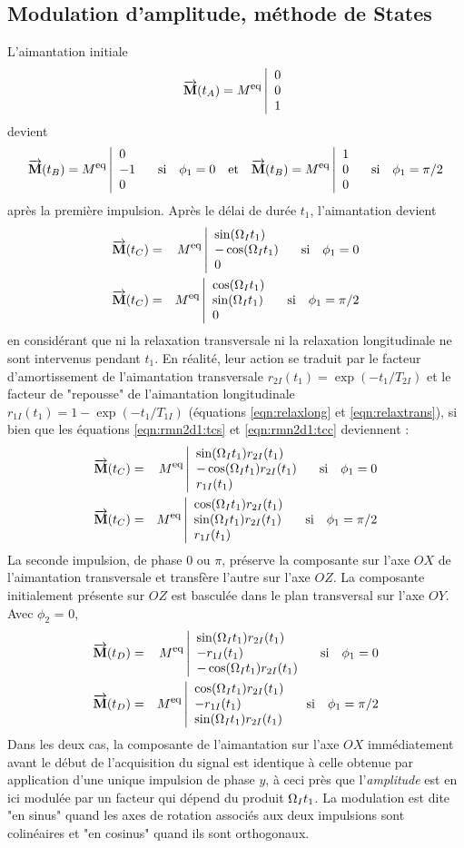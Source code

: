 \subsection{Modulation d'amplitude, méthode de States}
\label{sec:2d:cosy1noyau:amp}
L'aimantation initiale
\begin{equation}
\overrightarrow{\mathbf{M}}(t_A) = M^{\mbox{\footnotesize{eq}}}\left|\begin{array}{l}0\\0\\1\end{array}\right.
\end{equation}
devient
\begin{equation}
\overrightarrow{\mathbf{M}}(t_B) = M^{\mbox{\footnotesize{eq}}}\left|\begin{array}{l}0\\-1\\0\end{array}\right. \quad \mbox{si} \quad \phi_1 = 0 \quad \mbox{et} \quad
\overrightarrow{\mathbf{M}}(t_B) = M^{\mbox{\footnotesize{eq}}}\left|\begin{array}{l}1\\0\\0\end{array}\right. \quad \mbox{si} \quad \phi_1 = \pi/2
\end{equation}
après la première impulsion.
Après le délai de durée $t_1$, l'aimantation devient
\begin{eqnarray}
\label{eqn:rmn2d1:tcs}
\overrightarrow{\mathbf{M}}(t_C) & = & M^{\mbox{\footnotesize{eq}}}\left|\begin{array}{l}\sin(\Omega_I t_1)\\-\cos(\Omega_I t_1)\\0\end{array}\right. \quad \mbox{si} \quad \phi_1 = 0 \\
\label{eqn:rmn2d1:tcc}
\overrightarrow{\mathbf{M}}(t_C) & = & M^{\mbox{\footnotesize{eq}}}\left|\begin{array}{l}\cos(\Omega_I t_1)\\\sin(\Omega_I t_1)\\0\end{array}\right. \quad \mbox{si} \quad \phi_1 = \pi/2
\end{eqnarray}
en considérant que ni la relaxation transversale ni la relaxation longitudinale
ne sont intervenus pendant $t_1$.
En réalité, leur action se traduit par le facteur d'amortissement de l'aimantation transversale
$r_{2I}(t_1) = \exp(-t_1/T_{2I})$ et le facteur de "repousse" de l'aimantation longitudinale
$r_{1I}(t_1) = 1 - \exp(-t_1/T_{1I})$ (équations \ref{eqn:relaxlong} et \ref{eqn:relaxtrans}),
si bien que les équations \ref{eqn:rmn2d1:tcs} et \ref{eqn:rmn2d1:tcc} deviennent :
\begin{eqnarray}
\overrightarrow{\mathbf{M}}(t_C) & = & 
M^{\mbox{\footnotesize{eq}}}\left|\begin{array}{l}\sin(\Omega_I t_1) r_{2I}(t_1)\\-\cos(\Omega_I t_1) r_{2I}(t_1)\\r_{1I}(t_1)\end{array}\right.
\quad \mbox{si} \quad \phi_1 = 0 \\
\overrightarrow{\mathbf{M}}(t_C) & = & 
M^{\mbox{\footnotesize{eq}}}\left|\begin{array}{l}\cos(\Omega_I t_1) r_{2I}(t_1)\\\sin(\Omega_I t_1) r_{2I}(t_1)\\r_{1I}(t_1)\end{array}\right. 
\quad \mbox{si} \quad \phi_1 = \pi/2
\end{eqnarray}
La seconde impulsion, de phase 0 ou $\pi$, préserve la composante sur l'axe $OX$ de
l'aimantation transversale et transfère l'autre sur l'axe $OZ$. 
La composante initialement présente sur $OZ$ est basculée dans le plan 
transversal sur l'axe $OY$.
Avec $\phi_2$ = 0,
\begin{eqnarray}
\label{eqn:rmn2d1aimxx}
\overrightarrow{\mathbf{M}}(t_D) & = &
M^{\mbox{\footnotesize{eq}}}\left|\begin{array}{l}\sin(\Omega_I t_1) r_{2I}(t_1)\\-r_{1I}(t_1)\\-\cos(\Omega_I t_1) r_{2I}(t_1)\end{array}\right.
\quad \mbox{si} \quad \phi_1 = 0 \\
\label{eqn:rmn2d1aimyx}
\overrightarrow{\mathbf{M}}(t_D) & = & 
M^{\mbox{\footnotesize{eq}}}\left|\begin{array}{l}\cos(\Omega_I t_1) r_{2I}(t_1)\\-r_{1I}(t_1)\\\sin(\Omega_I t_1) r_{2I}(t_1)\end{array}\right.
\quad \mbox{si} \quad \phi_1 = \pi/2
\end{eqnarray}
Dans les deux cas, la composante de l'aimantation sur l'axe $OX$ immédiatement avant le début
de l'acquisition du signal est identique à celle obtenue par application
d'une unique impulsion de phase $y$, à ceci près que l'\emph{amplitude}
est en ici modulée par un facteur qui dépend du produit $\Omega_I t_1$.
La modulation est dite "en sinus" quand les axes de rotation associés aux deux impulsions
sont colinéaires et "en cosinus" quand ils sont orthogonaux.

